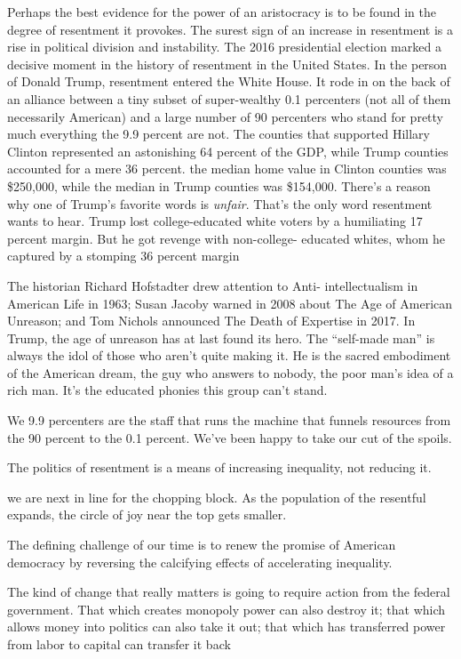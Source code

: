 \documentclass[
]{book}
\begin{document}
Perhaps the best evidence for the power of an aristocracy is to be
found in the degree of resentment it provokes.
The surest sign of an
increase in resentment is a rise in political division and instability.
The 2016 presidential election marked a decisive moment in the
history of resentment in the United States. In the person of Donald
Trump, resentment entered the White House. It rode in on the back
of an alliance between a tiny subset of super-wealthy 0.1 percenters
(not all of them necessarily American) and a large number of 90
percenters who stand for pretty much everything the 9.9 percent are
not.
The counties that supported Hillary Clinton represented an
astonishing 64 percent of the GDP, while Trump counties accounted
for a mere 36 percent.
the median home value in Clinton counties was
\$250,000, while the median in Trump counties was \$154,000.
There's a reason why one of
Trump's favorite words is \emph{unfair}. That's the only word resentment
wants to hear.
Trump lost college-educated white voters by a
humiliating 17 percent margin. But he got revenge with non-college-
educated whites, whom he captured by a stomping 36 percent
margin

The historian Richard Hofstadter drew attention to Anti-
intellectualism in American Life in 1963; Susan Jacoby warned in
2008 about The Age of American Unreason; and Tom Nichols
announced The Death of Expertise in 2017. In Trump, the age of
unreason has at last found its hero. The ``self-made man'' is always the
idol of those who aren't quite making it. He is the sacred
embodiment of the American dream, the guy who answers to nobody,
the poor man's idea of a rich man. It's the educated phonies this
group can't stand.

We 9.9 percenters are the staff that runs the machine that
funnels resources from the 90 percent to the 0.1 percent.
We've been happy to take our cut of the spoils.

The politics of resentment is a means of increasing
inequality, not reducing it.

we are next in line for the chopping
block. As the population of the resentful expands, the circle of joy
near the top gets smaller.

The defining challenge of our time is to renew the promise of
American democracy by reversing the calcifying effects of accelerating
inequality.

The kind of change that really matters is going to require action
from the federal government. That which creates monopoly power
can also destroy it; that which allows money into politics can also
take it out; that which has transferred power from labor to capital can
transfer it back
\end{document}
